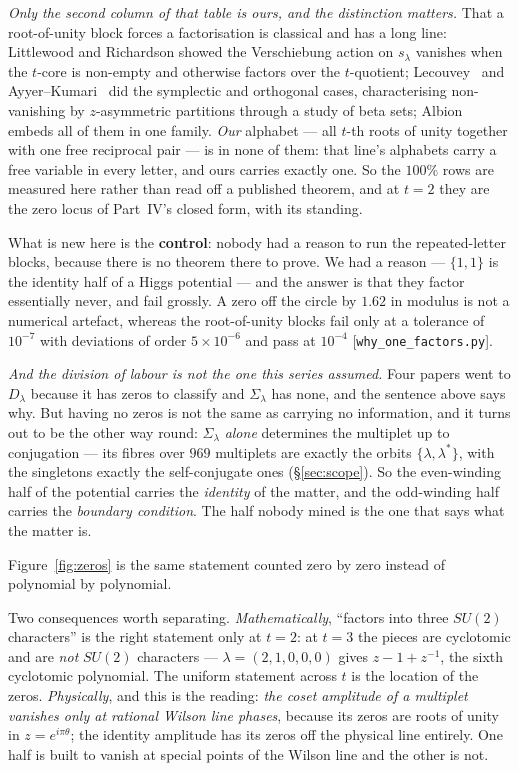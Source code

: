 \documentclass[11pt,a4paper]{article}
\newcommand{\Sig}{\Sigma_\lambda}
\newcommand{\Dl}{D_\lambda}
\begin{document}
\noindent \emph{Only the second column of that table is ours, and the distinction matters.} That a
root-of-unity block forces a factorisation is classical and has a long line: Littlewood and
Richardson showed the Verschiebung action on $s_\lambda$ vanishes when the $t$-core is non-empty and
otherwise factors over the $t$-quotient; Lecouvey~\cite{Lecouvey} and Ayyer--Kumari~\cite{AK} did the
symplectic and orthogonal cases, characterising non-vanishing by $z$-asymmetric partitions through a
study of beta sets; Albion~\cite{Albion} embeds all of them in one family. \emph{Our} alphabet ---
all $t$-th roots of unity together with one free reciprocal pair --- is in none of them: that line's
alphabets carry a free variable in every letter, and ours carries exactly one. So the $100\%$ rows
are measured here rather than read off a published theorem, and at $t=2$ they are the zero locus of
Part~IV's closed form, with its standing.

What is new here is the \textbf{control}: nobody had a reason to run the repeated-letter blocks,
because there is no theorem there to prove. We had a reason --- $\{1,1\}$ is the identity half of a
Higgs potential --- and the answer is that they factor essentially never, and fail grossly. A zero
off the circle by $1.62$ in modulus is not a numerical artefact, whereas the
root-of-unity blocks fail only at a tolerance of $10^{-7}$ with deviations of order $5\times10^{-6}$
and pass at $10^{-4}$ [\texttt{why\_one\_factors.py}].

\emph{And the division of labour is not the one this series assumed.} Four papers went to $\Dl$
because it has zeros to classify and $\Sig$ has none, and the sentence above says why. But having no
zeros is not the same as carrying no information, and it turns out to be the other way round:
$\Sig$ \emph{alone} determines the multiplet up to conjugation --- its fibres over $969$ multiplets
are exactly the orbits $\{\lambda,\lambda^*\}$, with the singletons exactly the self-conjugate ones
(\S\ref{sec:scope}). So the even-winding half of the potential carries the \emph{identity} of the
matter, and the odd-winding half carries the \emph{boundary condition}. The half nobody mined is the
one that says what the matter is.

Figure~\ref{fig:zeros} is the same statement
counted zero by zero instead of polynomial by polynomial.

Two consequences worth separating. \emph{Mathematically}, ``factors into three $SU(2)$ characters''
is the right statement only at $t=2$: at $t=3$ the pieces are cyclotomic and are \emph{not} $SU(2)$
characters --- $\lambda=(2,1,0,0,0)$ gives $z-1+z^{-1}$, the sixth cyclotomic polynomial. The uniform
statement across $t$ is the location of the zeros. \emph{Physically}, and this is the reading:
\emph{the coset amplitude of a multiplet vanishes only at rational Wilson line phases}, because its
zeros are roots of unity in $z=e^{i\pi\theta}$; the identity amplitude has its zeros off the physical
line entirely. One half is built to vanish at special points of the Wilson line and the other is not.
\end{document}
